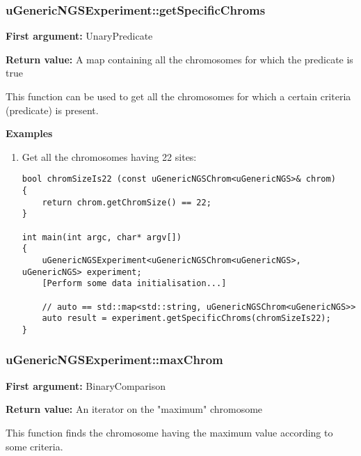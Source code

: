 \documentclass[letterpaper,10pt]{article}
\begin{document}
\subsubsection{uGenericNGSExperiment::getSpecificChroms}
\textbf{First argument:} UnaryPredicate

\noindent{}\textbf{Return value:} A map containing all the chromosomes for which the predicate is true

\bigskip
\noindent{}This function can be used to get all the chromosomes for which a certain criteria (predicate) is present.

\bigskip
\noindent{}\textbf{Examples}
\begin{enumerate}
 \item Get all the chromosomes having 22 sites:
\begin{verbatim}
bool chromSizeIs22 (const uGenericNGSChrom<uGenericNGS>& chrom)
{
    return chrom.getChromSize() == 22;
}

int main(int argc, char* argv[])
{
    uGenericNGSExperiment<uGenericNGSChrom<uGenericNGS>, uGenericNGS> experiment;
    [Perform some data initialisation...]

    // auto == std::map<std::string, uGenericNGSChrom<uGenericNGS>>
    auto result = experiment.getSpecificChroms(chromSizeIs22);
}
\end{verbatim}
\end{enumerate}

\subsubsection{uGenericNGSExperiment::maxChrom}
\textbf{First argument:} BinaryComparison

\noindent{}\textbf{Return value:} An iterator on the "maximum" chromosome

\bigskip
\noindent{}This function finds the chromosome having the maximum value according to some criteria.
\end{document}
